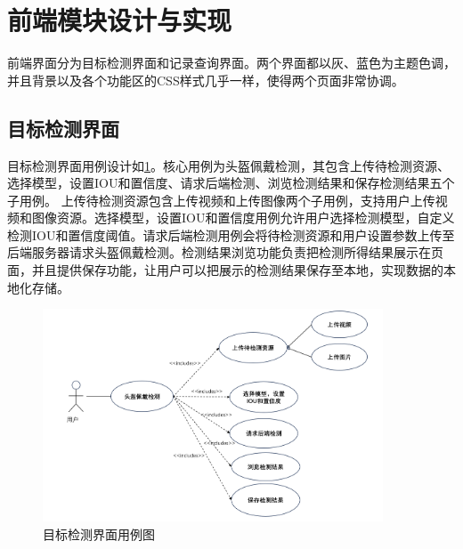 \section{前端模块设计与实现}
前端界面分为目标检测界面和记录查询界面。两个界面都以灰、蓝色为主题色调，并且背景以及各个功能区的CSS样式几乎一样，使得两个页面非常协调。
\subsection{目标检测界面}
目标检测界面用例设计如\ref{fig:uml1}。核心用例为头盔佩戴检测，其包含上传待检测资源、选择模型，设置IOU和置信度、请求后端检测、浏览检测结果和保存检测结果五个子用例。
上传待检测资源包含上传视频和上传图像两个子用例，支持用户上传视频和图像资源。选择模型，设置IOU和置信度用例允许用户选择检测模型，自定义检测IOU和置信度阈值。请求后端检测用例会将待检测资源和用户设置参数上传至后端服务器请求头盔佩戴检测。检测结果浏览功能负责把检测所得结果展示在页面，并且提供保存功能，让用户可以把展示的检测结果保存至本地，实现数据的本地化存储。

\begin{figure}[!htb]
    \centering
    \includegraphics[width=0.9\textwidth]{figs/chap05/uml1.png}
    \caption{目标检测界面用例图}
    \label{fig:uml1}
\end{figure}

